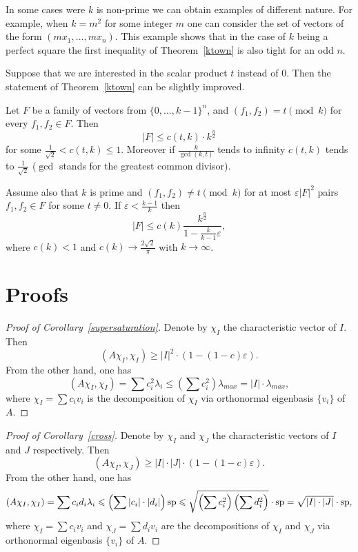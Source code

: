 \documentclass[8pt]{article}
\begin{document}
In some cases were $k$ is non-prime  we can obtain examples of different nature. For example, when $k=m^{2}$ for some integer $m$ one can consider the set of vectors of the form $(mx_1,\dots, mx_n)$. This example shows that in the case of $k$ being a perfect square the first inequality of Theorem~\ref{ktown} is also tight for an odd $n$.   

Suppose that we are interested in the scalar product $t$ instead of $0$. Then the statement of Theorem~\ref{ktown} can be slightly improved.

\begin{corollary}
Let $F$ be a family of vectors from $\{0,\dots,k-1\}^n$, and $(f_1,f_2) = t \pmod k$ for every $f_1,f_2 \in F$. Then
\[
|F| \leq c(t,k) \cdot k^{\frac{n}{2}}
\]
for some $\frac{1}{\sqrt{2}} < c(t,k) \leq 1$. Moreover if $\frac{k}{\gcd (k,t)}$ tends to infinity $c(t,k)$ tends to $\frac{1}{\sqrt{2}}$ ($\gcd$ stands for the greatest common divisor).

Assume also that $k$ is prime and $(f_1,f_2) \neq t \pmod k$ for at most $\varepsilon|F|^2$ pairs $f_1,f_2 \in F$ for some $t \neq 0$.
If $\varepsilon < \frac{k-1}{k}$ then
\[
|F| \leq c(k) \frac{k^{\frac{n}{2}}} {1 - \frac{k}{k-1} \varepsilon},
\]
where $c(k) < 1$ and $c(k) \to \frac{2\sqrt{2}}{\pi}$ with $k \to \infty$.
\label{slightlybetter}
\end{corollary}


\section{Proofs}

\begin{proof}[Proof of Corollary~\ref{supersaturation}]
Denote by $\chi_I$ the characteristic vector of $I$. Then
\[
(A\chi_I, \chi_I) \geq |I|^2 \cdot ( 1-(1-c)\varepsilon ).
\]
From the other hand, one has
\[
(A\chi_I, \chi_I) = \sum c_i^2\lambda_i \leq \left(\sum c_i^2 \right) \lambda_{max} = |I| \cdot \lambda_{max},
\]
where $\chi_I = \sum c_i v_i$ is the decomposition of $\chi_I$ via orthonormal eigenbasis $\{v_i\}$ of $A$. 
\end{proof}


\begin{proof}[Proof of Corollary~\ref{cross}]
Denote by $\chi_I$ and $\chi_J$ the characteristic vectors of $I$ and $J$ respectively. Then
\[
(A\chi_I, \chi_J) \geq |I| \cdot |J| \cdot ( 1-(1-c)\varepsilon ).
\]
From the other hand, one has
\[
(A\chi_I, \chi_I) = \sum c_i d_i \lambda_i \leqslant \left (\sum |c_i| \cdot |d_i| \right ) \operatorname{\operatorname{sp}} \leqslant \sqrt{\left(\sum c_i^2 \right)  \left(\sum d_i^2 \right) } \cdot \operatorname{\operatorname{sp}} = 
\sqrt{|I| \cdot |J|} \cdot \operatorname{\operatorname{sp}},
\]
where $\chi_I = \sum c_i v_i$ and $\chi_J = \sum d_i v_i$ are the decompositions of $\chi_I$ and $\chi_J$ via orthonormal eigenbasis $\{v_i\}$ of $A$. 

\end{proof}
\end{document}
